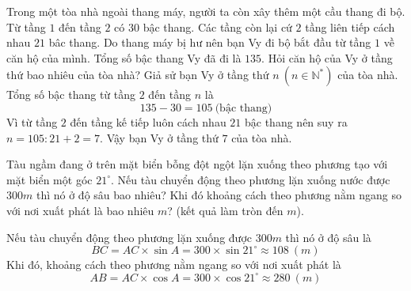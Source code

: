 \begin{ex}%
	Trong một tòa nhà ngoài thang máy, người ta còn xây thêm một cầu thang đi bộ. Từ tầng $1$ đến tầng $2$ có $30$ bậc thang. Các tầng còn lại cứ $2$ tầng liên tiếp cách nhau $21$ bâc thang. Do thang máy bị hư nên bạn Vy đi bộ bắt đầu từ tầng $1$ về căn hộ của mình. Tổng số bậc thang Vy đã đi là $135$. Hỏi căn hộ của Vy ở tầng thứ bao nhiêu của tòa nhà?
	\loigiai
	{
		Giả sử bạn Vy ở tầng thứ $n~(n \in \mathbb{N^*})$ của tòa nhà. Tổng số bậc thang từ tầng $2$ đến tầng $n$ là
		\[135-30=105~\text{(bậc thang)}\]
		Vì từ tầng $2$ đến tầng kế tiếp luôn cách nhau $21$ bậc thang nên suy ra $n=105:21+2=7$. Vậy bạn Vy ở tầng thứ $7$ của tòa nhà.
	}
\end{ex}
\begin{ex} Tàu ngầm đang ở trên mặt biển bỗng đột ngột lặn xuống theo phương tạo với mặt biển một góc $21^\circ$. Nếu tàu chuyển động theo phương lặn xuống nước được $300m$ thì nó ở độ sâu bao nhiêu? Khi đó khoảng cách theo phương nằm ngang so với nơi xuất phát là bao nhiêu $m$? (kết quả làm tròn đến $m$).
\loigiai
{
	\begin{center}
	\end{center}
Nếu tàu chuyển động theo phương lặn xuống được $300m$ thì nó ở độ sâu là
\[BC = AC \times \sin A = 300 \times \sin 21^\circ \approx 108~(m)\]
Khi đó, khoảng cách theo phương nằm ngang so với nơi xuất phát là
\[AB = AC \times \cos A = 300 \times \cos 21^\circ \approx 280~(m)\]
}
\end{ex}

